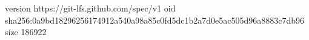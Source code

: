 version https://git-lfs.github.com/spec/v1
oid sha256:0a9bd18296256174912a540a98a85c0fd5dc1b2a7d0e5ac505d96a8883c7db96
size 186922
